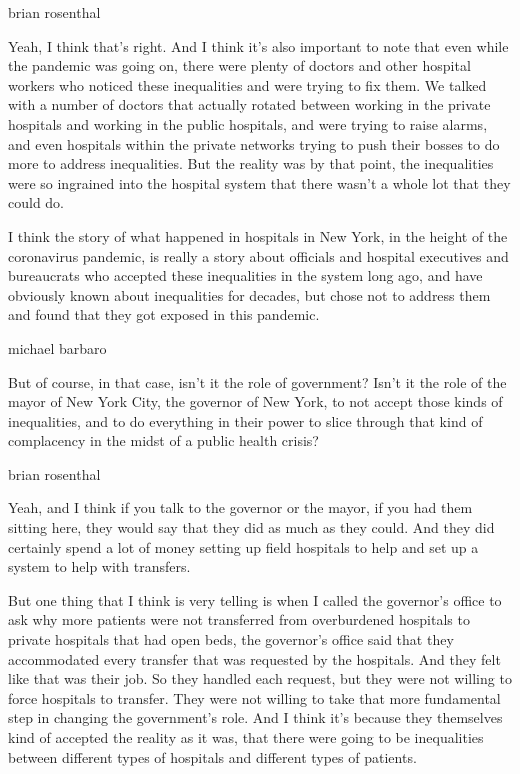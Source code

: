 brian rosenthal

Yeah, I think that's right. And I think it's also important to note that
even while the pandemic was going on, there were plenty of doctors and
other hospital workers who noticed these inequalities and were trying to
fix them. We talked with a number of doctors that actually rotated
between working in the private hospitals and working in the public
hospitals, and were trying to raise alarms, and even hospitals within
the private networks trying to push their bosses to do more to address
inequalities. But the reality was by that point, the inequalities were
so ingrained into the hospital system that there wasn't a whole lot that
they could do.

I think the story of what happened in hospitals in New York, in the
height of the coronavirus pandemic, is really a story about officials
and hospital executives and bureaucrats who accepted these inequalities
in the system long ago, and have obviously known about inequalities for
decades, but chose not to address them and found that they got exposed
in this pandemic.

michael barbaro

But of course, in that case, isn't it the role of government? Isn't it
the role of the mayor of New York City, the governor of New York, to not
accept those kinds of inequalities, and to do everything in their power
to slice through that kind of complacency in the midst of a public
health crisis?

brian rosenthal

Yeah, and I think if you talk to the governor or the mayor, if you had
them sitting here, they would say that they did as much as they could.
And they did certainly spend a lot of money setting up field hospitals
to help and set up a system to help with transfers.

But one thing that I think is very telling is when I called the
governor's office to ask why more patients were not transferred from
overburdened hospitals to private hospitals that had open beds, the
governor's office said that they accommodated every transfer that was
requested by the hospitals. And they felt like that was their job. So
they handled each request, but they were not willing to force hospitals
to transfer. They were not willing to take that more fundamental step in
changing the government's role. And I think it's because they themselves
kind of accepted the reality as it was, that there were going to be
inequalities between different types of hospitals and different types of
patients.

